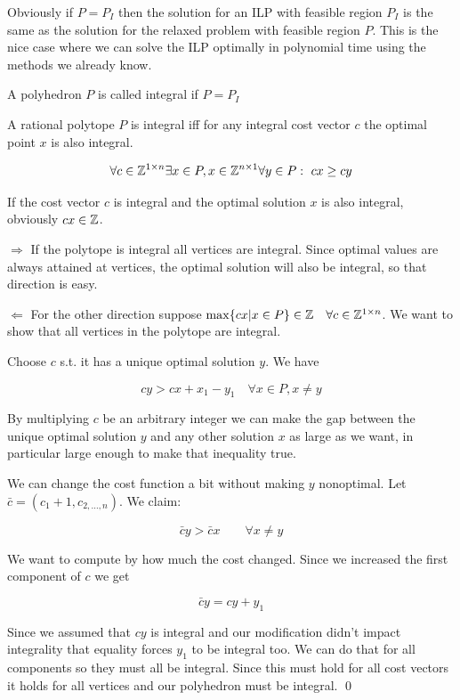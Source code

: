Obviously if $P=P_I$ then the solution for an ILP with feasible region $P_I$ is the same as the solution for the relaxed problem with feasible region $P$. This is the nice case where we can solve the ILP optimally in polynomial time using the methods we already know.

\begin{Def} A polyhedron $P$ is called integral if $P=P_I$\end{Def}

\begin{thm}\label{Thm:polyIntegrality} A rational polytope $P$ is integral iff for any integral cost vector $c$ the optimal point $x$ is also integral.

\[\forall c\in \mathbb{Z}^{1\times n}\exists x\in P,x\in \mathbb{Z}^{n\times 1} \forall y \in P:\ cx\geq cy\] 
\end{thm}

If the cost vector $c$ is integral and the optimal solution $x$ is also integral, obviously $cx\in \mathbb{Z}$.

\begin{pr} $\Rightarrow$ If the polytope is integral all vertices are integral. Since optimal values are always attained at vertices, the optimal solution will also be integral, so that direction is easy.

$\Leftarrow$ For the other direction suppose $\max \{cx | x\in P\}\in \mathbb{Z}\quad \forall c\in \mathbb{Z}^{1\times n}$. We want to show that all vertices in the polytope are integral.

Choose $c$ s.t. it has a unique optimal solution $y$. We have 

\[cy>cx + x_1 -y_1 \quad \forall x\in P,x\neq y\]

By multiplying $c$ be an arbitrary integer we can make the gap between the unique optimal solution $y$ and any other solution $x$ as large as we want, in particular large enough to make that inequality true.

We can change the cost function a bit without making $y$ nonoptimal. Let $\bar c = (c_1+1,c_{2,\ldots,n})$. We claim:

\[\bar c y > \bar c x\qquad \forall x\neq y\]

We want to compute by how much the cost changed. Since we increased the first component of $c$ we get

\[\bar c y = cy+y_1\]

Since we assumed that $cy$ is integral and our modification didn't impact integrality that equality forces $y_1$ to be integral too. We can do that for all components so they must all be integral. Since this must hold for all cost vectors it holds for all vertices and our polyhedron must be integral.
\qed \end{pr}

